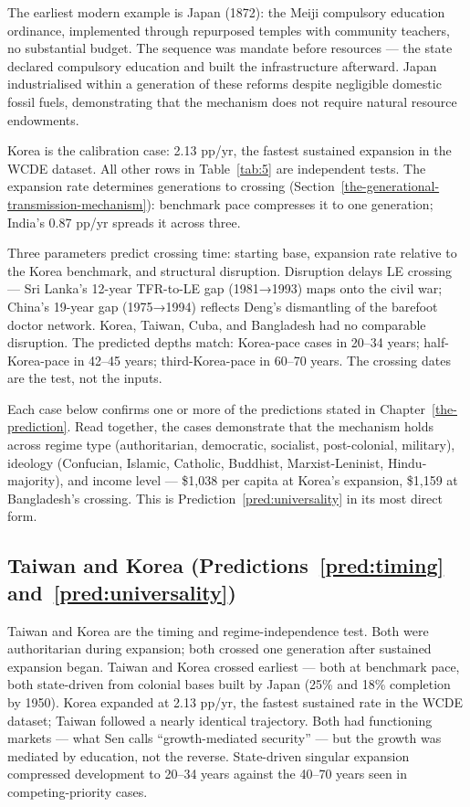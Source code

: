 \documentclass[12pt,letterpaper]{article}
\begin{document}
The earliest modern example is Japan (1872): the Meiji compulsory
education ordinance, implemented through repurposed temples with
community teachers, no substantial budget. The sequence was mandate
before resources --- the state declared compulsory education and built
the infrastructure afterward. Japan industrialised within a generation
of these reforms despite negligible domestic fossil fuels, demonstrating
that the mechanism does not require natural resource endowments.

Korea is the calibration case: 2.13 pp/yr, the fastest sustained
expansion in the WCDE dataset. All other rows in Table~\ref{tab:5} are
independent tests. The expansion rate determines generations to crossing
(Section~\ref{the-generational-transmission-mechanism}): benchmark pace compresses it to one generation; India's
0.87 pp/yr spreads it across three.

Three parameters predict crossing time: starting base, expansion rate
relative to the Korea benchmark, and structural disruption. Disruption
delays LE crossing --- Sri Lanka's 12-year TFR-to-LE gap (1981→1993)
maps onto the civil war; China's 19-year gap (1975→1994) reflects
Deng's dismantling of the barefoot doctor network. Korea, Taiwan, Cuba,
and Bangladesh had no comparable disruption. The predicted depths match:
Korea-pace cases in 20--34 years; half-Korea-pace in 42--45 years;
third-Korea-pace in 60--70 years. The crossing dates are the test, not
the inputs.

Each case below confirms one or more of the predictions stated in
Chapter~\ref{the-prediction}. Read together, the cases demonstrate
that the mechanism holds across regime type (authoritarian,
democratic, socialist, post-colonial, military), ideology (Confucian,
Islamic, Catholic, Buddhist, Marxist-Leninist, Hindu-majority), and
income level --- \$1,038 per capita at Korea's expansion, \$1,159 at
Bangladesh's crossing. This is Prediction~\ref{pred:universality} in
its most direct form.

\subsection{Taiwan and Korea (Predictions~\ref{pred:timing} and~\ref{pred:universality})}\label{taiwan-and-korea}

Taiwan and Korea are the timing and regime-independence test. Both
were authoritarian during expansion; both crossed one generation after
sustained expansion began. Taiwan and Korea crossed earliest --- both
at benchmark pace, both state-driven from colonial bases built by
Japan (25\% and 18\% completion by 1950). Korea expanded at 2.13 pp/yr, the fastest sustained
rate in the WCDE dataset; Taiwan followed a nearly identical trajectory.
Both had functioning markets --- what Sen calls ``growth-mediated
security'' --- but the growth was mediated by education, not the reverse.
State-driven singular expansion compressed development to 20--34 years
against the 40--70 years seen in competing-priority cases.
\end{document}
